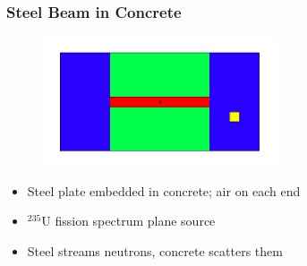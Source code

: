 \documentclass[xcolor=x11names,compress]{beamer}
\renewcommand{\(}{\begin{columns}}
\renewcommand{\)}{\end{columns}}
\newcommand{\<}[1]{\begin{column}{#1}}
\renewcommand{\>}{\end{column}}
\begin{document}
\begin{frame}[fragile]
  \frametitle{Steel Beam in Concrete}
  
  	\begin{figure}
  	\begin{center}
  		\includegraphics[height=1.5in,clip]{../figs/steel-beam.png}\\
	\end{center}
  	\end{figure} 
%
    \begin{itemize}
    \item Steel plate embedded in concrete; air on each end
    \item $^{235}$U fission spectrum plane source
    \item Steel streams neutrons, concrete scatters them
    \end{itemize}

\end{frame}
\end{document}
